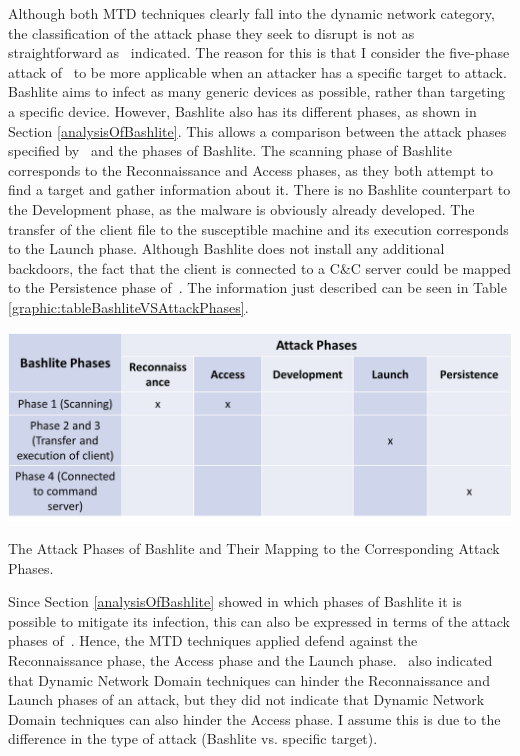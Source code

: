 Although both MTD techniques clearly fall into the dynamic network category, the classification of the attack phase they seek to disrupt is not as straightforward as~\cite{article:okhraviFindingFocus} indicated. The reason for this is that I consider the five-phase attack of~\cite{article:okhraviFindingFocus} to be more applicable when an attacker has a specific target to attack. Bashlite aims to infect as many generic devices as possible, rather than targeting a specific device. However, Bashlite also has its different phases, as shown in Section \ref{analysisOfBashlite}. This allows a comparison between the attack phases specified by~\cite{article:okhraviFindingFocus} and the phases of Bashlite. The scanning phase of Bashlite corresponds to the Reconnaissance and Access phases, as they both attempt to find a target and gather information about it. There is no Bashlite counterpart to the Development phase, as the malware is obviously already developed. The transfer of the client file to the susceptible machine and its execution corresponds to the Launch phase. Although Bashlite does not install any additional backdoors, the fact that the client is connected to a C\&C server could be mapped to the Persistence phase of~\cite{article:okhraviFindingFocus}. The information just described can be seen in Table \ref{graphic:tableBashliteVSAttackPhases}.

\begin{table}[tph]
\includegraphics[scale=0.7]{assets/tableBashliteVSAttackPhases.png}
\centering
\caption{The Attack Phases of Bashlite and Their Mapping to the Corresponding Attack Phases.}
\label{graphic:tableBashliteVSAttackPhases}
\end{table}


Since Section \ref{analysisOfBashlite} showed in which phases of Bashlite it is possible to mitigate its infection, this can also be expressed in terms of the attack phases of~\cite{article:okhraviFindingFocus}. Hence, the MTD techniques applied defend against the Reconnaissance phase, the Access phase and the Launch phase.~\cite{article:okhraviFindingFocus} also indicated that Dynamic Network Domain techniques can hinder the Reconnaissance and Launch phases of an attack, but they did not indicate that Dynamic Network Domain techniques can also hinder the Access phase. I assume this is due to the difference in the type of attack (Bashlite vs. specific target).



